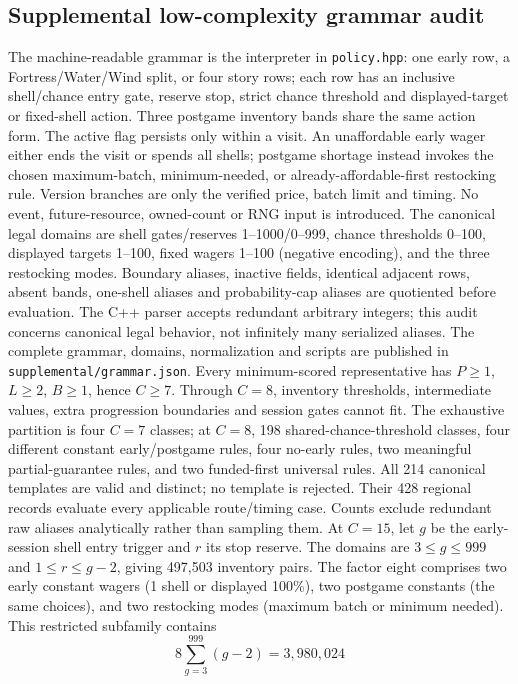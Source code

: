 \documentclass[11pt]{article}
\theoremstyle{definition}\newtheorem{definition}[theorem]{Definition}
\begin{document}
\subsection{Supplemental low-complexity grammar audit}
The machine-readable grammar is the interpreter in \texttt{policy.hpp}: one early row, a Fortress/Water/Wind split, or four story rows; each row has an inclusive shell/chance entry gate, reserve stop, strict chance threshold and displayed-target or fixed-shell action. Three postgame inventory bands share the same action form. The active flag persists only within a visit. An unaffordable early wager either ends the visit or spends all shells; postgame shortage instead invokes the chosen maximum-batch, minimum-needed, or already-affordable-first restocking rule. Version branches are only the verified price, batch limit and timing. No event, future-resource, owned-count or RNG input is introduced.
The canonical legal domains are shell gates/reserves 1--1000/0--999, chance thresholds 0--100, displayed targets 1--100, fixed wagers 1--100 (negative encoding), and the three restocking modes. Boundary aliases, inactive fields, identical adjacent rows, absent bands, one-shell aliases and probability-cap aliases are quotiented before evaluation. The C++ parser accepts redundant arbitrary integers; this audit concerns canonical legal behavior, not infinitely many serialized aliases. The complete grammar, domains, normalization and scripts are published in \texttt{supplemental/grammar.json}.
Every minimum-scored representative has $P\ge1$, $L\ge2$, $B\ge1$, hence $C\ge7$. Through $C=8$, inventory thresholds, intermediate values, extra progression boundaries and session gates cannot fit. The exhaustive partition is four $C=7$ classes; at $C=8$, 198 shared-chance-threshold classes, four different constant early/postgame rules, four no-early rules, two meaningful partial-guarantee rules, and two funded-first universal rules. All 214 canonical templates are valid and distinct; no template is rejected. Their 428 regional records evaluate every applicable route/timing case. Counts exclude redundant raw aliases analytically rather than sampling them.
At $C=15$, let $g$ be the early-session shell entry trigger and $r$ its stop reserve. The domains are $3\le g\le999$ and $1\le r\le g-2$, giving 497,503 inventory pairs. The factor eight comprises two early constant wagers (1 shell or displayed 100\%), two postgame constants (the same choices), and two restocking modes (maximum batch or minimum needed). This restricted subfamily contains
\[
 8\sum_{g=3}^{999}(g-2)=3{,}980{,}024
\]
\end{document}

